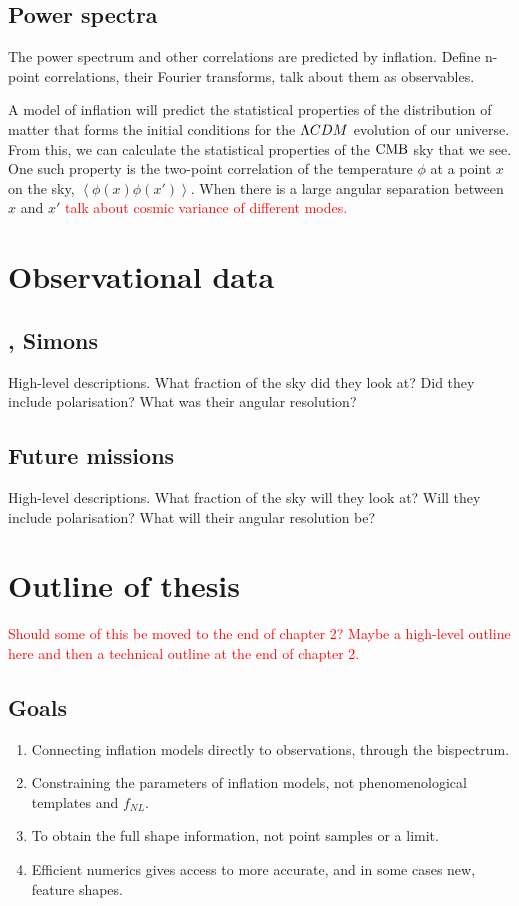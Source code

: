     \subsection{Power spectra}
    The power spectrum and other correlations
    are predicted by inflation. 
    Define n-point correlations, their Fourier transforms, talk about them as observables.
    

    A model of inflation will predict the statistical properties of the distribution of matter
    that forms the initial conditions for the $\Lambda CDM$ evolution of our universe.
    From this, we can calculate the statistical properties of the $\text{CMB}$ sky that we see.
    One such property is the two-point correlation of the temperature $\phi$
    at a point $x$ on the sky, $\left<\phi(x)\phi(x')\right>$. When there is a large
    angular separation between $x$ and $x'$ \textcolor{red}{talk about cosmic variance
    of different modes.}
\newpage
\section{Observational data}
    \subsection{\planck, Simons} 
    High-level descriptions.
    What fraction of the sky did they look at?
    Did they include polarisation?
    What was their angular resolution?
\newpage
    \subsection{Future missions}
    High-level descriptions.
    What fraction of the sky will they look at?
    Will they include polarisation?
    What will their angular resolution be?
\newpage
\section{Outline of thesis}
\textcolor{red}{Should some of this be moved to the end of chapter 2? Maybe a high-level outline here
and then a technical outline at the end of chapter 2.}
    \subsection{Goals}
    \begin{enumerate}
        \item Connecting inflation models directly to observations,
            through the bispectrum.
        \item Constraining the parameters of inflation models, not phenomenological templates and $f_{NL}$.
        \item To obtain the full shape information, not point samples or a limit.
        \item Efficient numerics gives access to more accurate, and in some cases new, feature shapes.
    \end{enumerate}
\newpage
